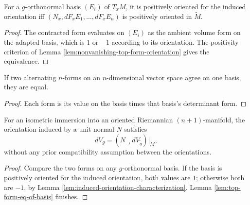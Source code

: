 \begin{lemma}
\label{lem:induced-orientation-characterization}
\leanok
{}
For a $g$-orthonormal basis $(E_i)$ of $T_xM$, it is positively oriented for the induced orientation iff $(N_x,dF_xE_1,\ldots,dF_xE_n)$ is positively oriented in $\widetilde M$.
\end{lemma}

\begin{proof}
\leanok
{}
\sketch The contracted form evaluates on $(E_i)$ as the ambient volume form on the adapted basis, which is $1$ or $-1$ according to its orientation. The positivity criterion of Lemma \ref{lem:nonvanishing-top-form-orientation} gives the equivalence.
\end{proof}

\begin{lemma}
\label{lem:top-form-eq-of-basis}
\leanok
If two alternating $n$-forms on an $n$-dimensional vector space agree on one basis, they are equal.
\end{lemma}

\begin{proof}
\leanok
\sketch Each form is its value on the basis times that basis's determinant form.
\end{proof}

\begin{proposition}
\label{prop:hypersurface-volume-form-induced}
\leanok
{}
For an isometric immersion into an oriented Riemannian $(n+1)$-manifold, the orientation induced by a unit normal $N$ satisfies
\[
dV_g=(N\lrcorner dV_{\widetilde g})|_M,
\]
without any prior compatibility assumption between the orientations.
\end{proposition}

\begin{proof}
\leanok
{}
\sketch Compare the two forms on any $g$-orthonormal basis. If the basis is positively oriented for the induced orientation, both values are $1$; otherwise both are $-1$, by Lemma \ref{lem:induced-orientation-characterization}. Lemma \ref{lem:top-form-eq-of-basis} finishes.
\end{proof}

